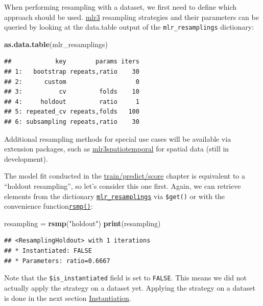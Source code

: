 \documentclass[]{scrbook}
\newenvironment{Shaded}{\begin{snugshade}}{\end{snugshade}}
\newcommand{\KeywordTok}[1]{\textcolor[rgb]{0.13,0.29,0.53}{\textbf{#1}}}
\newcommand{\NormalTok}[1]{#1}
\newcommand{\StringTok}[1]{\textcolor[rgb]{0.31,0.60,0.02}{#1}}
\renewenvironment{Shaded} {\begin{snugshade}\small} {\end{snugshade}}
\begin{document}
When performing resampling with a dataset, we first need to define which approach should be used.
\href{https://mlr3.mlr-org.com}{mlr3} resampling strategies and their parameters can be queried by looking at the data.table output of the \texttt{mlr\_resamplings} dictionary:

\begin{Shaded}
\begin{Highlighting}[]
\KeywordTok{as.data.table}\NormalTok{(mlr_resamplings)}
\end{Highlighting}
\end{Shaded}

\begin{verbatim}
##            key        params iters
## 1:   bootstrap repeats,ratio    30
## 2:      custom                   0
## 3:          cv         folds    10
## 4:     holdout         ratio     1
## 5: repeated_cv repeats,folds   100
## 6: subsampling repeats,ratio    30
\end{verbatim}

Additional resampling methods for special use cases will be available via extension packages, such as \href{https://github.com/mlr-org/mlr3spatiotemporal}{mlr3spatiotemporal} for spatial data (still in development).

The model fit conducted in the \protect\hyperlink{train-predict}{train/predict/score} chapter is equivalent to a ``holdout resampling'', so let's consider this one first.
Again, we can retrieve elements from the dictionary \href{https://mlr3.mlr-org.com/reference/mlr_resamplings.html}{\texttt{mlr\_resamplings}} via \texttt{\$get()} or with the convenience function\href{https://mlr3.mlr-org.com/reference/mlr_sugar.html}{\texttt{rsmp()}}:

\begin{Shaded}
\begin{Highlighting}[]
\NormalTok{resampling =}\StringTok{ }\KeywordTok{rsmp}\NormalTok{(}\StringTok{"holdout"}\NormalTok{)}
\KeywordTok{print}\NormalTok{(resampling)}
\end{Highlighting}
\end{Shaded}

\begin{verbatim}
## <ResamplingHoldout> with 1 iterations
## * Instantiated: FALSE
## * Parameters: ratio=0.6667
\end{verbatim}

Note that the \texttt{\$is\_instantiated} field is set to \texttt{FALSE}.
This means we did not actually apply the strategy on a dataset yet.
Applying the strategy on a dataset is done in the next section \protect\hyperlink{instantiation}{Instantiation}.
\end{document}
